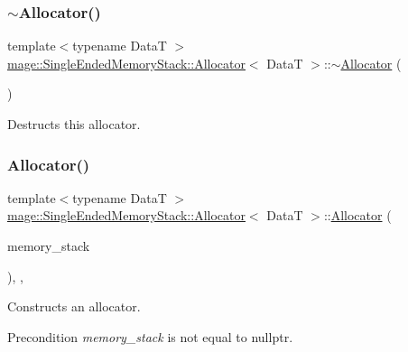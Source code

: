 \subsubsection{\texorpdfstring{$\sim$\+Allocator()}{~Allocator()}}
{\footnotesize\ttfamily template$<$typename DataT $>$ \\
\hyperlink{classmage_1_1_single_ended_memory_stack_1_1_allocator}{mage\+::\+Single\+Ended\+Memory\+Stack\+::\+Allocator}$<$ DataT $>$\+::$\sim$\hyperlink{classmage_1_1_single_ended_memory_stack_1_1_allocator}{Allocator} (\begin{DoxyParamCaption}{ }\end{DoxyParamCaption})\hspace{0.3cm}{\ttfamily [default]}}

Destructs this allocator. \hypertarget{classmage_1_1_single_ended_memory_stack_1_1_allocator_a991173b1fccf74994dc9298b3cffb795}{}\label{classmage_1_1_single_ended_memory_stack_1_1_allocator_a991173b1fccf74994dc9298b3cffb795} 
\subsubsection{\texorpdfstring{Allocator()}{Allocator()}\hspace{0.1cm}{\footnotesize\ttfamily [4/4]}}
{\footnotesize\ttfamily template$<$typename DataT $>$ \\
\hyperlink{classmage_1_1_single_ended_memory_stack_1_1_allocator}{mage\+::\+Single\+Ended\+Memory\+Stack\+::\+Allocator}$<$ DataT $>$\+::\hyperlink{classmage_1_1_single_ended_memory_stack_1_1_allocator}{Allocator} (\begin{DoxyParamCaption}\item[{\hyperlink{classmage_1_1_single_ended_memory_stack}{Single\+Ended\+Memory\+Stack} $\ast$}]{memory\+\_\+stack }\end{DoxyParamCaption})\hspace{0.3cm}{\ttfamily [explicit]}, {\ttfamily [private]}, {\ttfamily [noexcept]}}

Constructs an allocator.

\begin{DoxyPrecond}{Precondition}
{\itshape memory\+\_\+stack} is not equal to {\ttfamily nullptr}. 
\end{DoxyPrecond}


